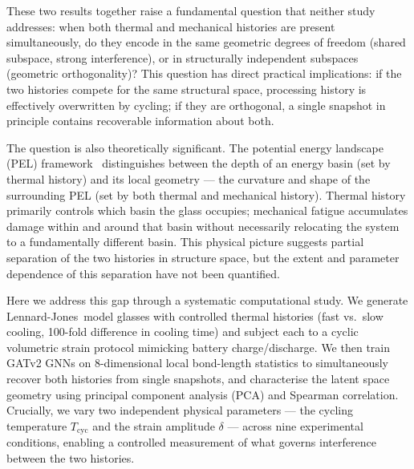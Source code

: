 \documentclass[12pt,a4paper]{article}
\newcommand{\Tbat}{T_{\mathrm{cyc}}}
\newcommand{\LJ}{Lennard-Jones}
\begin{document}
These two results together raise a fundamental question that neither study addresses: when both thermal and mechanical histories are present simultaneously, do they encode in the same geometric degrees of freedom (shared subspace, strong interference), or in structurally independent subspaces (geometric orthogonality)?
This question has direct practical implications: if the two histories compete for the same structural space, processing history is effectively overwritten by cycling; if they are orthogonal, a single snapshot in principle contains recoverable information about both.

The question is also theoretically significant.
The potential energy landscape (PEL) framework~\cite{Stillinger1995,Wales2003} distinguishes between the depth of an energy basin (set by thermal history) and its local geometry — the curvature and shape of the surrounding PEL (set by both thermal and mechanical history).
Thermal history primarily controls which basin the glass occupies; mechanical fatigue accumulates damage within and around that basin without necessarily relocating the system to a fundamentally different basin.
This physical picture suggests partial separation of the two histories in structure space, but the extent and parameter dependence of this separation have not been quantified.

Here we address this gap through a systematic computational study.
We generate \LJ\ model glasses with controlled thermal histories (fast vs.\ slow cooling, 100-fold difference in cooling time) and subject each to a cyclic volumetric strain protocol mimicking battery charge/discharge.
We then train GATv2 GNNs on 8-dimensional local bond-length statistics to simultaneously recover both histories from single snapshots, and characterise the latent space geometry using principal component analysis (PCA) and Spearman correlation.
Crucially, we vary two independent physical parameters — the cycling temperature $\Tbat$ and the strain amplitude $\delta$ — across nine experimental conditions, enabling a controlled measurement of what governs interference between the two histories.
\end{document}
